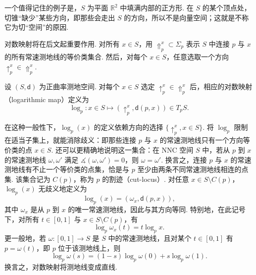 一个值得记住的例子是，$S$ 为平面 $\mathbb R^2$ 中填满内部的正方形. 在 $S$ 的某个顶点处，切锥“缺少”某些方向，即那些会走出 $S$ 的方向，所以不是向量空间；这就是不称它为切“空间”的原因.

对数映射将在后文起重要作用. 对所有 $x\in S$，用 $\Uparrow_p^x\subset\Sigma_p$ 表示 $S$ 中连接 $p$ 与 $x$ 的所有常速测地线的等价类集合. 然后，对每个 $x\in S$，任意选取一个方向 $\uparrow_p^x\in\Uparrow_p^x$.
\begin{definition}[对数映射]\label{def:7.20}
设 $(S,\mathsf d)$ 为正曲率测地空间. 对每个 $x\in S$ 选定 $\uparrow_p^x\in\Uparrow_p^x$ 后，相应的对数映射（logarithmic map）定义为
$$\log_p:x\in S\mapsto(\uparrow_p^x,\mathsf d(p,x))\in T_pS.$$
\end{definition}
在这种一般性下，$\log_p(x)$ 的定义依赖方向的选择 $\{\uparrow_p^x,x\in S\}$. 将 $\log_p$ 限制在适当子集上，就能消除歧义：即那些连接 $p$ 与 $x$ 的常速测地线只有一个方向等价类的点 $x\in S$. 还可以更精确地说明这一集合：在 NNC 空间 $S$ 中，若从 $p$ 到 $x$ 的常速测地线 $\omega,\omega'$ 满足 $\measuredangle(\omega,\omega')=0$，则 $\omega=\omega'$. 换言之，连接 $p$ 与 $x$ 的常速测地线有不止一个等价类的点集，恰是与 $p$ 至少由两条不同常速测地线相连的点集. 该集合记为 $C(p)$，称为 $p$ 的割迹（cut-locus）. 对任意 $x\in S\setminus C(p)$，$\log_p(x)$ 无歧义地定义为
$$\log_p(x)=(\omega_x,\mathsf d(p,x)),$$
其中 $\omega_x$ 是从 $p$ 到 $x$ 的唯一常速测地线，因此与其方向等同. 特别地，在此记号下，对所有 $t\in[0,1]$ 与 $x\in S\setminus C(p)$，有
$$\log_p\omega_x(t)=t\log_px.$$
更一般地，若 $\omega:[0,1]\to S$ 是 $S$ 中的常速测地线，且对某个 $t\in[0,1]$ 有 $p=\omega(t)$，即 $p$ 位于该测地线上，则
\begin{equation}\label{eq:7.14}
\log_p\omega(s)=(1-s)\log_p\omega(0)+s\log_p\omega(1).
\end{equation}
换言之，对数映射将测地线变成直线.

